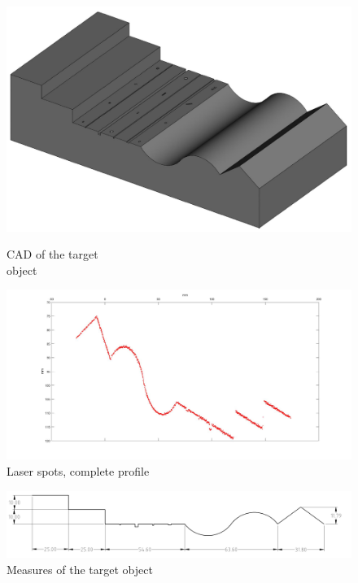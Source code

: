 \begin{figure}
  \begin{minipage}[c]{.44\textwidth}
    \centering
    \includegraphics[width=\textwidth]{./images/analysis/t1/cad.png}
    \caption{CAD of the target \\ object}
    \label{fig:c5-cad}
  \end{minipage}
  \hfill
  \begin{minipage}[c]{.55\textwidth}
    \centering
    \includegraphics[width=\textwidth]{./images/analysis/t1/pixel_profile_cut.jpg}
    \caption{Laser spots, complete profile}
    \label{fig:c5-profile_pixel}
  \end{minipage}
\end{figure}
\vfill
\begin{figure}
  \centering
  \includegraphics[width=\textwidth]{./images/analysis/t1/cad_misure.png}
  \caption{Measures of the target object}
  \label{fig:c5-cad-misure}
\end{figure}
